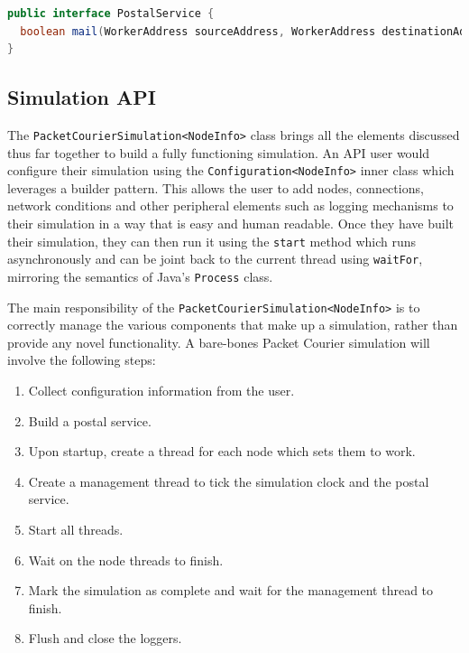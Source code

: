 \begin{lstlisting}[language=Java,caption={The \texttt{PostalService} interface exactly as it appears in the
codebase.},label={code:postal_service_interface},captionpos=b]
public interface PostalService {
  boolean mail(WorkerAddress sourceAddress, WorkerAddress destinationAddress, Packet packet);
}
\end{lstlisting}

\subsection{Simulation API}\label{subsection:simulation_api}

The \texttt{PacketCourierSimulation<NodeInfo>} class brings all the elements discussed thus far together to build a
fully functioning simulation. An API user would configure their simulation using the \texttt{Configuration<NodeInfo>}
inner class which leverages a builder pattern\cite{builder_pattern}. This allows the user to add nodes, connections,
network conditions and other peripheral elements such as logging mechanisms to their simulation in a way that is easy
and human readable. Once they have built their simulation, they can then run it using the \texttt{start} method which
runs asynchronously and can be joint back to the current thread using \texttt{waitFor}, mirroring the semantics of
Java's \texttt{Process} class\cite{java_Process}.

The main responsibility of the \texttt{PacketCourierSimulation<NodeInfo>} is to correctly manage the various
components that make up a simulation, rather than provide any novel functionality. A bare-bones Packet Courier
simulation will involve the following steps:
\begin{enumerate}
    \item Collect configuration information from the user.
    \item Build a postal service.
    \item Upon startup, create a thread for each node which sets them to work.
    \item Create a management thread to tick the simulation clock and the postal service.
    \item Start all threads.
    \item Wait on the node threads to finish.
    \item Mark the simulation as complete and wait for the management thread to finish.
    \item Flush and close the loggers.
\end{enumerate}

